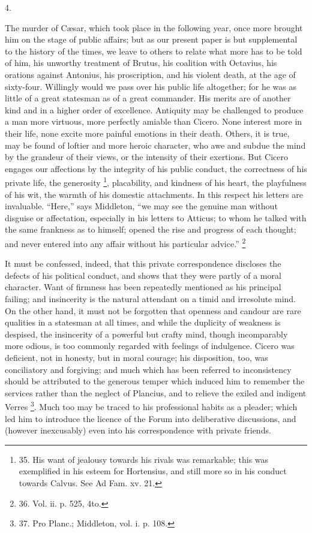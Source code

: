 4.

The murder of Cæsar, which
took place in the following year, once more brought him on the stage
of public affairs; but as our present paper is but supplemental to the
history of the times, we leave to others to relate what more has to be
told of him, his unworthy treatment of Brutus, his coalition with
Octavius, his orations against Antonius, his proscription, and his
violent death, at the age of sixty-four. Willingly would we pass over
his public life altogether; for he was as little of a great statesman
as of a great commander. His merits are of another kind and in a
higher order of excellence. Antiquity may be challenged to produce a
man more virtuous, more perfectly amiable than Cicero. None interest
more in their life, none excite more painful emotions in their death.
Others, it is true, may be found of loftier and more heroic character,
who awe and subdue the mind by the grandeur of their views, or the
intensity of their exertions. But Cicero engages our affections
by the integrity of his public conduct, the correctness of his private
life, the generosity \footnote{35. His want of jealousy
towards his rivals was remarkable; this was exemplified in his esteem
for Hortensius, and still more so in his conduct towards Calvus. See
Ad Fam. xv. 21.},
placability, and kindness of his heart, the playfulness of his wit,
the warmth of his domestic attachments. In this respect his letters
are invaluable. ``Here,'' says Middleton, ``we may see the genuine man
without disguise or affectation, especially in his letters to Atticus;
to whom he talked with the same frankness as to himself; opened the
rise and progress of each thought; and never entered into any affair
without his particular advice.'' \footnote{36. Vol. ii. p. 525, 4to.}

It must be confessed, indeed,
that this private correspondence discloses the defects of his
political conduct, and shows that they were partly of a moral
character. Want of firmness has been repeatedly mentioned as his
principal failing; and insincerity is the natural attendant on a timid
and irresolute mind. On the other hand, it must not be forgotten that
openness and candour are rare qualities in a statesman at all times,
and while the duplicity of weakness is despised, the insincerity of a
powerful but crafty mind, though incomparably more odious, is too
commonly regarded with feelings of indulgence. Cicero was deficient,
not in honesty, but in moral courage; his disposition, too, was
conciliatory and forgiving; and much which has been referred to
inconsistency should be attributed to the generous temper which
induced him to remember the services rather than the neglect of
Plancius, and to relieve the exiled and indigent Verres \footnote{37. Pro Planc.; Middleton,
vol. i. p. 108.}. Much too may be traced to his professional habits as a
pleader; which led him to introduce the licence of the Forum
into deliberative discussions, and (however inexcusably) even into his
correspondence with private friends.

